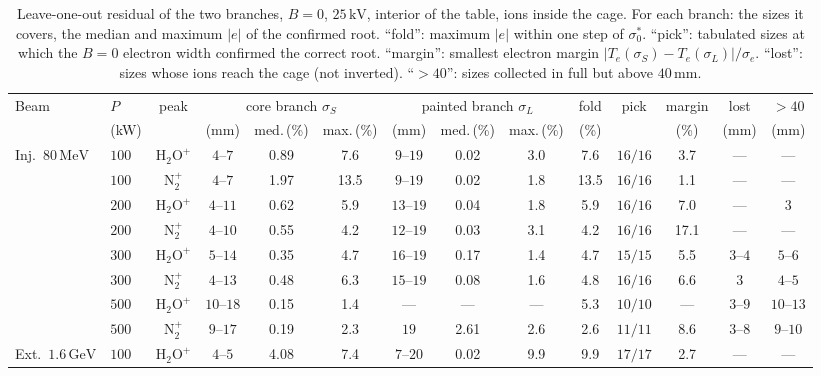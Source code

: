 \documentclass[hyperref]{cernrep}
\begin{document}
\begin{table}[htbp]
\centering
\caption{Leave-one-out residual of the two branches, $B=0$,
$25\,\mathrm{kV}$, interior of the table, ions inside the cage. For each
branch: the sizes it covers, the median and maximum $|e|$ of the
confirmed root. ``fold'': maximum $|e|$ within one step of
$\sigma_0^*$. ``pick'': tabulated sizes at which the $B=0$ electron
width confirmed the correct root. ``margin'': smallest electron margin
$|T_e(\sigma_S)-T_e(\sigma_L)|/\sigma_e$. ``lost'': sizes
whose ions reach the cage (not inverted). ``$>40$'': sizes collected
in full but above $40\,\mathrm{mm}$.}
\label{tab:invp}
{\footnotesize
\setlength{\tabcolsep}{3pt}
\begin{tabular}{llcccccccccccc}
\hline\hline
Beam & $P$ & peak & \multicolumn{3}{c}{core branch $\sigma_S$} &
\multicolumn{3}{c}{painted branch $\sigma_L$} & fold & pick & margin & lost & $>40$ \\
 & (kW) & & (mm) & med.\,(\%) & max.\,(\%) & (mm) & med.\,(\%) & max.\,(\%) & (\%) & & (\%) & (mm) & (mm) \\
\hline
Inj.\ $80\,\mathrm{MeV}$ & $100$ & $\mathrm{H}_2\mathrm{O}^+$ & $4$--$7$ & 0.89 & 7.6 & $9$--$19$ & 0.02 & 3.0 & 7.6 & $16/16$ & 3.7 & --- & --- \\
 & $100$ & $\mathrm{N}_2^+$ & $4$--$7$ & 1.97 & 13.5 & $9$--$19$ & 0.02 & 1.8 & 13.5 & $16/16$ & 1.1 & --- & --- \\
 & $200$ & $\mathrm{H}_2\mathrm{O}^+$ & $4$--$11$ & 0.62 & 5.9 & $13$--$19$ & 0.04 & 1.8 & 5.9 & $16/16$ & 7.0 & --- & $3$ \\
 & $200$ & $\mathrm{N}_2^+$ & $4$--$10$ & 0.55 & 4.2 & $12$--$19$ & 0.03 & 3.1 & 4.2 & $16/16$ & 17.1 & --- & --- \\
 & $300$ & $\mathrm{H}_2\mathrm{O}^+$ & $5$--$14$ & 0.35 & 4.7 & $16$--$19$ & 0.17 & 1.4 & 4.7 & $15/15$ & 5.5 & $3$--$4$ & $5$--$6$ \\
 & $300$ & $\mathrm{N}_2^+$ & $4$--$13$ & 0.48 & 6.3 & $15$--$19$ & 0.08 & 1.6 & 4.8 & $16/16$ & 6.6 & $3$ & $4$--$5$ \\
 & $500$ & $\mathrm{H}_2\mathrm{O}^+$ & $10$--$18$ & 0.15 & 1.4 & --- & --- & --- & 5.3 & $10/10$ & --- & $3$--$9$ & $10$--$13$ \\
 & $500$ & $\mathrm{N}_2^+$ & $9$--$17$ & 0.19 & 2.3 & $19$ & 2.61 & 2.6 & 2.6 & $11/11$ & 8.6 & $3$--$8$ & $9$--$10$ \\
\hline
Ext.\ $1.6\,\mathrm{GeV}$ & $100$ & $\mathrm{H}_2\mathrm{O}^+$ & $4$--$5$ & 4.08 & 7.4 & $7$--$20$ & 0.02 & 9.9 & 9.9 & $17/17$ & 2.7 & --- & --- \\

\end{tabular}}
\end{table}
\end{document}
